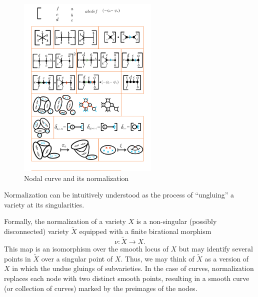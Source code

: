 \documentclass[12pt]{memoir}
\begin{document}
\begin{Rmk} %
\begin{figure}[h!]
        \centering
        \includegraphics[width=0.6\textwidth, trim= 1.32cm 9.5cm 12.7cm 15.4cm,clip]{../figs/FigsDNnotability1.pdf}
        \caption{Nodal curve and its normalization}
        \label{fig:normalization-example}
    \end{figure}
Normalization can be intuitively understood as the process of ``ungluing'' a variety at its singularities.\par
Formally, the normalization of a variety $X$ is a non-singular (possibly disconnected) variety $\widetilde X$ equipped with a finite birational morphism 
$$\nu:\widetilde X\to X.$$
This map is an isomorphism over the smooth locus of $X$ but may identify several points in $\widetilde X$ over a singular point of $X$. Thus, we may think of $\widetilde X$ as a version of $X$ in which the undue gluings of subvarieties. In the case of curves, normalization replaces each node with two distinct smooth points, resulting in a smooth curve (or collection of curves) marked by the preimages of the nodes. 
\end{Rmk}
\end{document}
